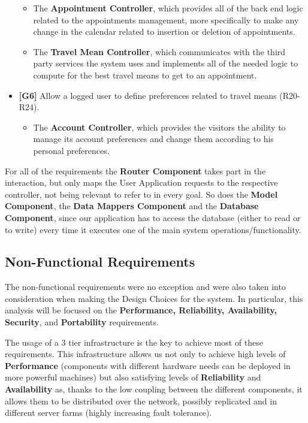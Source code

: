 \documentclass[12pt]{article}
\begin{document}
\begin{itemize}
\begin{itemize}
        \item The \textbf{Appointment Controller}, which provides all of the back end logic related to the appointments management, more specifically to make any change in the calendar related to insertion or deletion of appointments.
        \item The \textbf{Travel Mean Controller}, which communicates with the third party services the system uses and implements all of the needed logic to compute for the best travel means to get to an appointment.
    \end{itemize}
    \item \textbf{{[G6]}} Allow a logged user to define preferences related to travel means (R20-R24).
    \begin{itemize}
        \item The \textbf{Account Controller}, which provides the visitors the ability to manage its account preferences and change them according to his personal preferences.
    \end{itemize}
\end{itemize}
For all of the requirements the \textbf{Router Component} takes part in the interaction, but only maps the User Application requests to the respective controller, not being relevant to refer to in every goal. So does the \textbf{Model Component}, the \textbf{Data Mappers Component} and the \textbf{Database Component}, since our application has to access the database (either to read or to write) every time it executes one of the main system operations/functionality.

\subsection{Non-Functional Requirements}

The non-functional requirements were no exception and were also taken into consideration when making the Design Choices for the system. In particular, this analysis will be focused on the \textbf{Performance, Reliability, Availability, Security}, and \textbf{Portability} requirements.

The usage of a 3 tier infrastructure is the key to achieve most of these requirements. This infrastructure allows us not only to achieve high levels of \textbf{Performance} (components with different hardware needs can be deployed in more powerful machines) but also satisfying levels of \textbf{Reliability} and \textbf{Availability} as, thanks to the low coupling between the different components, it allows them to be distributed over the network, possibly replicated and in different server farms (highly increasing fault tolerance).
\end{document}
